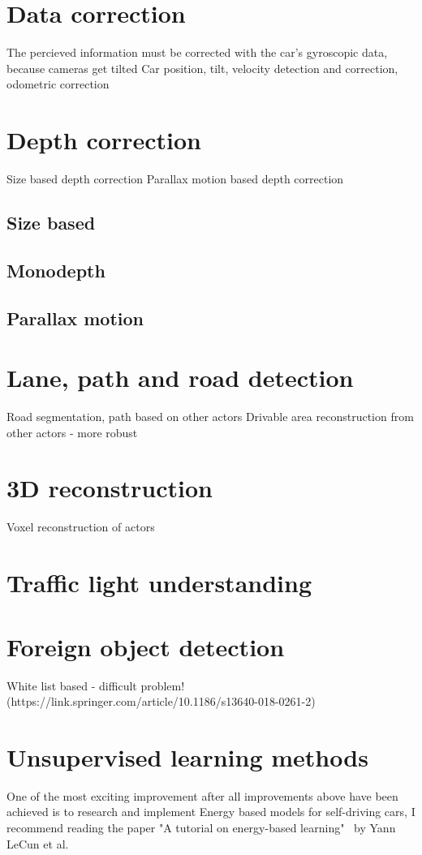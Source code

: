 \section{Data correction}


The percieved information must be corrected with the car's gyroscopic data,
because cameras get tilted Car position, tilt, velocity detection and correction,
odometric correction


\section{Depth correction}
Size based depth correction
Parallax motion based depth correction
\subsection{Size based}
\subsection{Monodepth}
\subsection{Parallax motion}
\section{Lane, path and road detection}
Road segmentation, path  based on other actors
Drivable area reconstruction from other actors - more robust


\section{3D reconstruction}
Voxel reconstruction of actors
\section{Traffic light understanding}
\section{Foreign object detection}
White list based - difficult problem! (https://link.springer.com/article/10.1186/s13640-018-0261-2)

\section{Unsupervised learning methods}
One of the most exciting improvement after all improvements above have been
achieved is to research and implement Energy based models for self-driving cars,
I recommend reading the paper "A tutorial on energy-based
learning"~\cite{Lecun98gradient-basedlearning} by Yann LeCun et al.